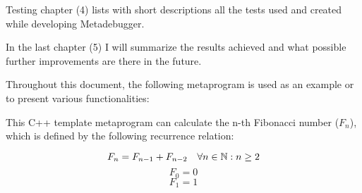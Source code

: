 Testing chapter (4) lists with short descriptions all the tests used and
created while developing Metadebugger.

In the last chapter (5) I will summarize the results achieved and what possible
further improvements are there in the future.


Throughout this document, the following metaprogram is used as an example or to
present various functionalities:


This C++ template metaprogram can calculate the n-th Fibonacci number
(\(F_n\)), which is defined by the following recurrence relation:

\[
    F_n = F_{n-1} + F_{n-2} \quad \forall n \in \mathbb{N}: n \geq 2 \\
\]
\[
    F_0 = 0
\]
\[
    F_1 = 1
\]
